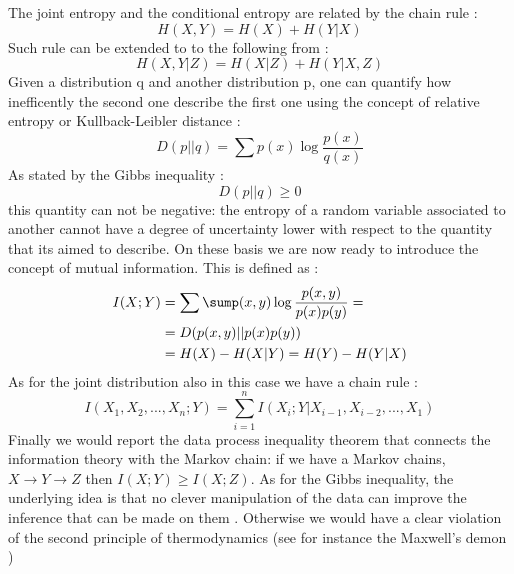 \documentclass[12pt,%
               a4paper,%
               oneside,openany,%
               titlepage,%
               headinclude,footinclude,%
               BCOR5mm,%
               cleardoublepage=empty,%
               tablecaptionabove,%
               floatperchapter,
               ]{scrreprt}                 %
\begin{document}
The joint entropy and the conditional entropy are related by the chain rule \cite{cover2006elements}:
\begin{equation}
H(X,Y)=H(X)+H(Y|X)
\end{equation}
Such rule can be extended to to the following from \cite{cover2006elements}:
\begin{equation}
H(X,Y|Z)=H(X|Z)+H(Y|X,Z)
\end{equation}
Given a distribution q and another distribution p, one can quantify how inefficently the second one describe the first one using the concept of relative entropy or Kullback-Leibler distance \cite{cover2006elements,mackay2003information}:
\begin{equation}
D(p||q)=\sum p(x)\log\frac{p(x)}{q(x)}
\end{equation}
As stated by the Gibbs inequality \cite{cover2006elements,mackay2003information}:
\begin{equation}
D(p||q)\geq 0
\end{equation}
this quantity can not be negative: the entropy of a random variable associated to another cannot have a degree of uncertainty lower with respect to the quantity that its aimed to describe. On these basis we are now ready to introduce the concept of mutual information. This is defined as  \cite{cover2006elements}:
\begin{equation}
\begin{split}
I(X;Y)&=\sum\sump(x,y)\log\dfrac{p(x,y)}{p(x)p(y)}=\\
&=D(p(x,y)||p(x)p(y)) \\
&=H(X)-H(X|Y)=H(Y)-H(Y|X)
\end{split}
\end{equation}
As for the joint distribution also in this case we have a chain rule  \cite{cover2006elements}:
\begin{equation}
I(X_{1},X_{2},...,X_{n};Y)=\sum^{n}_{i=1}I(X_{i};Y|X_{i-1},X_{i-2},...,X_{1})
\end{equation}
Finally we would report the data process inequality theorem that connects the information theory with the Markov chain: if we have a Markov chains, $X\rightarrow Y \rightarrow Z$  then $I(X;Y)\geq I(X;Z) $. As for the Gibbs inequality, the underlying idea is that no clever manipulation of the data can improve the inference that can be made on them \cite{cover2006elements,mackay2003information}. Otherwise we would have a clear violation of the second principle of thermodynamics (see for instance the Maxwell's demon \cite{feynman2018feynman})
\end{document}
